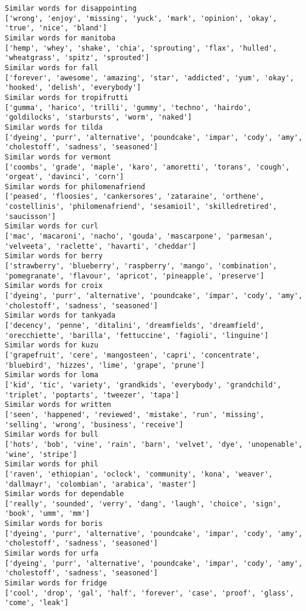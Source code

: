 \documentclass[11pt]{article}
\begin{document}
\begin{Verbatim}[commandchars=\\\{\}]
Similar words for disappointing
['wrong', 'enjoy', 'missing', 'yuck', 'mark', 'opinion', 'okay', 'true', 'nice', 'bland']
Similar words for manitoba
['hemp', 'whey', 'shake', 'chia', 'sprouting', 'flax', 'hulled', 'wheatgrass', 'spitz', 'sprouted']
Similar words for fall
['forever', 'awesome', 'amazing', 'star', 'addicted', 'yum', 'okay', 'hooked', 'delish', 'everybody']
Similar words for tropifrutti
['gumma', 'harico', 'trilli', 'gummy', 'techno', 'hairdo', 'goldilocks', 'starbursts', 'worm', 'naked']
Similar words for tilda
['dyeing', 'purr', 'alternative', 'poundcake', 'impar', 'cody', 'amy', 'cholestoff', 'sadness', 'seasoned']
Similar words for vermont
['coombs', 'grade', 'maple', 'karo', 'amoretti', 'torans', 'cough', 'orgeat', 'davinci', 'corn']
Similar words for philomenafriend
['peased', 'floosies', 'cankersores', 'zataraine', 'orthene', 'costellinis', 'philomenafriend', 'sesamioil', 'skilledretired', 'saucisson']
Similar words for curl
['mac', 'macaroni', 'nacho', 'gouda', 'mascarpone', 'parmesan', 'velveeta', 'raclette', 'havarti', 'cheddar']
Similar words for berry
['strawberry', 'blueberry', 'raspberry', 'mango', 'combination', 'pomegranate', 'flavour', 'apricot', 'pineapple', 'preserve']
Similar words for croix
['dyeing', 'purr', 'alternative', 'poundcake', 'impar', 'cody', 'amy', 'cholestoff', 'sadness', 'seasoned']
Similar words for tankyada
['decency', 'penne', 'ditalini', 'dreamfields', 'dreamfield', 'orecchiette', 'barilla', 'fettuccine', 'fagioli', 'linguine']
Similar words for kuzu
['grapefruit', 'cere', 'mangosteen', 'capri', 'concentrate', 'bluebird', 'hizzes', 'lime', 'grape', 'prune']
Similar words for loma
['kid', 'tic', 'variety', 'grandkids', 'everybody', 'grandchild', 'triplet', 'poptarts', 'tweezer', 'tapa']
Similar words for written
['seen', 'happened', 'reviewed', 'mistake', 'run', 'missing', 'selling', 'wrong', 'business', 'receive']
Similar words for bull
['hots', 'bob', 'vine', 'rain', 'barn', 'velvet', 'dye', 'unopenable', 'wine', 'stripe']
Similar words for phil
['raven', 'ethiopian', 'oclock', 'community', 'kona', 'weaver', 'dallmayr', 'colombian', 'arabica', 'master']
Similar words for dependable
['really', 'sounded', 'verry', 'dang', 'laugh', 'choice', 'sign', 'book', 'umm', 'mm']
Similar words for boris
['dyeing', 'purr', 'alternative', 'poundcake', 'impar', 'cody', 'amy', 'cholestoff', 'sadness', 'seasoned']
Similar words for urfa
['dyeing', 'purr', 'alternative', 'poundcake', 'impar', 'cody', 'amy', 'cholestoff', 'sadness', 'seasoned']
Similar words for fridge
['cool', 'drop', 'gal', 'half', 'forever', 'case', 'proof', 'glass', 'come', 'leak']

\end{Verbatim}
\end{document}
